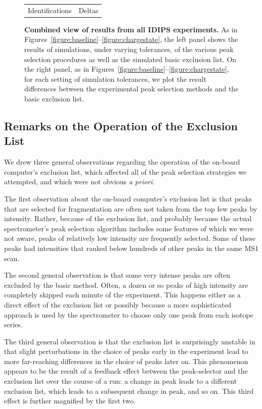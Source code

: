 \documentclass[12pt,twoside,openright]{report}
\begin{document}
\begin{figure}
\begin{tabular}{cc}
Identifications & Deltas \\
\end{tabular}
\caption[Combined view of results from all IDIPS experiments]{{\bf Combined view
    of results from all IDIPS experiments.} As in
  Figures~\ref{figure:baseline}--\ref{figure:chargestate}, the left panel shows
  the results of simulations, under varying tolerances, of the various peak
  selection procedures as well as the simulated basic exclusion list.  On the
  right panel, as in Figures~\ref{figure:baseline}--\ref{figure:chargestate},
  for each setting of simulation tolerances, we plot the result differences
  between the experimental peak selection methods and the basic exclusion list.
  \label{figure:all}}
\end{figure}


\subsection{Remarks on the Operation of the Exclusion List}
\label{subsection:stability}

We drew three general observations regarding the operation of the on-board
computer's exclusion list, which affected all of the peak selection strategies
we attempted, and which were not obvious {\it a priori}.

The first observation about the on-board computer's exclusion list is that peaks
that are selected for fragmentation are often not taken from the top few peaks
by intensity. Rather, because of the exclusion list, and probably because the
actual spectrometer's peak selection algorithm includes some features of which
we were not aware, peaks of relatively low intensity are frequently
selected. Some of these peaks had intensities that ranked below hundreds of
other peaks in the same MS1 scan.

The second general observation is that some very intense peaks are often
excluded by the basic method. Often, a dozen or so peaks of high intensity are
completely skipped each minute of the experiment. This happens either as a
direct effect of the exclusion list or possibly because a more sophisticated
approach is used by the spectrometer to choose only one peak from each isotope
series.

The third general observation is that the exclusion list is surprisingly
unstable in that slight perturbations in the choice of peaks early in the
experiment lead to more far-reaching differences in the choice of peaks later
on. This phenomenon appears to be the result of a feedback effect between the
peak-selector and the exclusion list over the course of a run: a change in peak
leads to a different exclusion list, which leads to a subsequent change in peak,
and so on. This third effect is further magnified by the first two.
\end{document}
